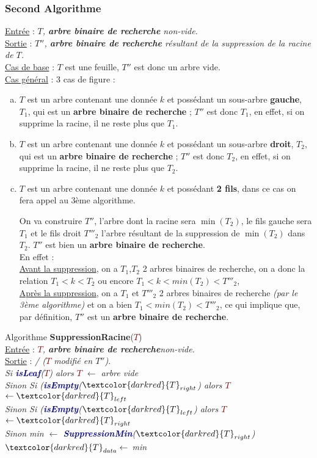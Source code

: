 \documentclass{article}
\newcommand{\abr}{\textbf{arbre binaire de recherche }}
\newcommand{\abrb}{\textbf{arbre binaire de recherche}}
\newcommand{\algo}[1]{\textcolor{darkblue}{\textbf{#1}}}
\newcommand{\param}[1]{\textcolor{darkred}{#1}}
\begin{document}
\subsubsection{Second Algorithme}

\noindent\underline{Entrée} : \textit{$T$, \abr non-vide.} \\
\underline{Sortie} : \textit{$T''$, \abr résultant de la suppression de la racine de $T$.} \\

\noindent\underline{Cas de base} : $T$ est une feuille, $T''$ est donc un arbre vide. \\
\underline{Cas général} : 3 cas de figure : \\
\begin{enumerate}[a)]
 \item $T$ est un arbre contenant une donnée $k$ et possédant un sous-arbre \textbf{gauche}, $T_1$, qui est un \abr;
$T''$ est donc $T_1$, en effet, si on supprime la racine, il ne reste plus que $T_1$.
 \item $T$ est un arbre contenant une donnée $k$ et possédant un sous-arbre \textbf{droit}, $T_2$, qui est un \abr;
$T''$ est donc $T_2$, en effet, si on supprime la racine, il ne reste plus que $T_2$.
 \item $T$ est un arbre contenant une donnée $k$ et possédant \textbf{2 fils}, dans ce cas on fera appel au 3ème algorithme.

On va construire $T''$, l'arbre dont la racine sera $\min{(T_2)}$, le fils gauche sera $T_1$ et le fils droit $T'''_2$
l'arbre résultant de la suppression de $\min{(T_2)}$ dans $T_2$. $T''$ est bien un \abrb. \\
En effet : \\
\underline{Avant la suppression}, on a $T_1$,$T_2$ 2 arbres binaires de recherche, on a donc la relation $T_1<k<T_2$ 
ou encore $T_1<k<min(T_2)<T'''_2$, \\
\underline{Après la suppression}, on a $T_1$ et $T'''_2$ 2 arbres binaires de recherche \textit{(par le 3ème algorithme)}
et on a bien $T_1 < min(T_2) < T'''_2$, ce qui implique que, par définition, $T''$ est un \abrb. \\
\end{enumerate}

\noindent Algorithme \textbf{SuppressionRacine}(\param{$T$}) \\
\underline{Entrée} : \textit{\param{$T$}, \abrb non-vide.} \\
\underline{Sortie} : \textit{/ (\param{$T$} modifié en \textbf{$T''$})}.\\
\textit
{
Si \algo{isLeaf}(\param{$T$}) alors \param{$T$} $\leftarrow$ arbre vide\\
\indent Sinon Si (\algo{isEmpty}($\param{T}_{right}$) alors \param{$T$} $\leftarrow \param{T}_{left}$ \\
\indent\indent Sinon Si (\algo{isEmpty}($\param{T}_{left}$) alors \param{$T$} $\leftarrow \param{T}_{right}$ \\
\indent\indent\indent\indent Sinon min $\leftarrow$ \algo{SuppressionMin}($\param{T}_{right}$) \\
\indent\indent\indent\indent\indent\indent $\param{T}_{data} \leftarrow$ min
}
\end{document}
